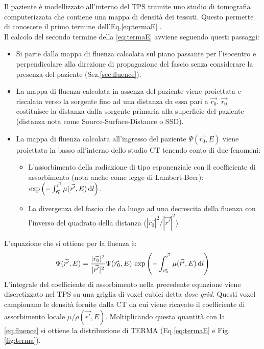 {Il paziente è modellizzato all'interno del TPS tramite uno studio di tomografia computerizzata che contiene una mappa di densità dei tessuti. Questo permette di conoscere il primo termine dell'Eq.\eqref{eq:termaE} \cite{RaySearchLaboratories2014}.\\
Il calcolo del secondo termine della \eqref{eq:termaE} avviene seguendo questi passaggi:
\begin{itemize}
\item Si parte dalla mappa di fluenza calcolata sul piano passante per l'isocentro e perpendicolare alla direzione di propagazione del fascio senza considerare la presenza del paziente (Sez.\ref{sec:fluence}).
\item La mappa di fluenza calcolata in assenza del paziente viene proiettata e riscalata verso la sorgente fino ad una distanza da essa pari a $\vec{r_0}$. $\vec{r_0}$ costituisce la distanza dalla sorgente primaria alla superficie del paziente (distanza nota come Source-Surface-Distance o SSD).
\item La mappa di fluenza calcolata all'ingresso del paziente $\Psi(\vec{r_0},E)$ viene proiettata in basso all'interno dello studio CT tenendo conto di due fenomeni:
\begin{itemize}
\item L'assorbimento della radiazione di tipo esponenziale con il coefficiente di assorbimento (nota anche come legge di Lambert-Beer): $\exp{\left( -\int_{\vec{r_0}}^{\vec{r'}} \mu(\vec{r'},E) \,\text{d}l \right)}$.
\item La divergenza del fascio che da luogo ad una decrescita della fluenza con l'inverso del quadrato della distanza ($|\vec{r_0}|^2 / |\vec{r'}|^2$)
\end{itemize}
\end{itemize}
L'equazione che si ottiene per la fluenza è:
\begin{equation}
\label{eq:fluence}
\Psi(\vec{r'},E) = \frac{|\vec{r_0}|^2}{|\vec{r'}|^2}\Psi(\vec{r_0},E)\,\exp{\left( -\int_{\vec{r_0}}^{\vec{r'}} \mu(\vec{r'},E) \,\text{d}l \right)}
\end{equation}
L'integrale del coefficiente di assorbimento nella precedente equazione viene discretizzato nel TPS su una griglia di voxel cubici detta \textit{dose grid}. Questi voxel campionano le densità fornite dalla CT da cui viene ricavato il coefficiente di assorbimento locale $\mu / \rho(\vec{r'},E)$. Moltiplicando questa quantità con la \eqref{eq:fluence} si ottiene la distribuzione di TERMA (Eq.\eqref{eq:termaE} e Fig.\ref{fig:terma}).

}
